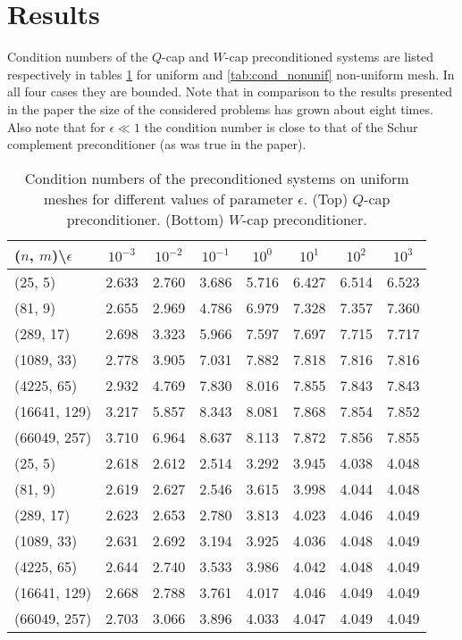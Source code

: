 \documentclass[10pt, a4paper]{article}
\begin{document}
\section*{Results}
Condition numbers of the $Q$-cap and $W$-cap preconditioned systems are listed 
respectively in tables \ref{tab:cond_unif} for uniform and 
\ref{tab:cond_nonunif} non-uniform mesh. In all four cases they are 
bounded. Note that in comparison to the results presented in the paper the size 
of the considered problems has grown about eight times. Also 
note that for $\epsilon \ll 1$ the condition number is close to that of the Schur 
complement preconditioner (as was true in the paper).
\begin{table}[ht]
  \caption{Condition numbers of the preconditioned systems on uniform
  meshes for different values of parameter $\epsilon$. (Top) $Q$-cap
  preconditioner. (Bottom) $W$-cap preconditioner.
}
\label{tab:cond_unif}
\footnotesize{
\begin{tabular}{l|ccccccc}
\hline
($n$, $m$)\textbackslash $\epsilon$ & $10^{-3}$ & $10^{-2}$ & $10^{-1}$ & $10^{0}$ & $10^{1}$ & $10^{2}$ & $10^{3}$\\
\hline
(25, 5) & 2.633 & 2.760 & 3.686 & 5.716 & 6.427 & 6.514 & 6.523\\
(81, 9) & 2.655 & 2.969 & 4.786 & 6.979 & 7.328 & 7.357 & 7.360\\
(289, 17) & 2.698 & 3.323 & 5.966 & 7.597 & 7.697 & 7.715 & 7.717\\
(1089, 33) & 2.778 & 3.905 & 7.031 & 7.882 & 7.818 & 7.816 & 7.816\\
(4225, 65) & 2.932 & 4.769 & 7.830 & 8.016 & 7.855 & 7.843 & 7.843\\
(16641, 129) & 3.217 & 5.857 & 8.343 & 8.081 & 7.868 & 7.854 & 7.852\\
(66049, 257) & 3.710 & 6.964 & 8.637 & 8.113 & 7.872 & 7.856 & 7.855\\
\hline
\hline
(25, 5) & 2.618 & 2.612 & 2.514 & 3.292 & 3.945 & 4.038 & 4.048\\
(81, 9) & 2.619 & 2.627 & 2.546 & 3.615 & 3.998 & 4.044 & 4.048\\
(289, 17) & 2.623 & 2.653 & 2.780 & 3.813 & 4.023 & 4.046 & 4.049\\
(1089, 33) & 2.631 & 2.692 & 3.194 & 3.925 & 4.036 & 4.048 & 4.049\\
(4225, 65) & 2.644 & 2.740 & 3.533 & 3.986 & 4.042 & 4.048 & 4.049\\
(16641, 129) & 2.668 & 2.788 & 3.761 & 4.017 & 4.046 & 4.049 & 4.049\\
(66049, 257) & 2.703 & 3.066 & 3.896 & 4.033 & 4.047 & 4.049 & 4.049\\
\hline
\end{tabular}
}
\end{table}
\end{document}
